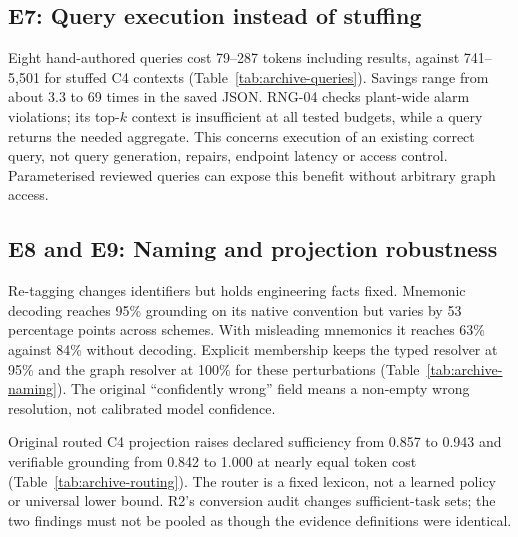 \subsection{E7: Query execution instead of stuffing}

Eight hand-authored queries cost 79--287 tokens including results, against
741--5,501 for stuffed C4 contexts (Table~\ref{tab:archive-queries}). Savings
range from about 3.3 to 69 times in the saved JSON. RNG-04 checks plant-wide alarm violations;
its top-$k$ context is insufficient at all tested budgets, while a query returns
the needed aggregate. This concerns execution of an existing correct query, not
query generation, repairs, endpoint latency or access control. Parameterised
reviewed queries can expose this benefit without arbitrary graph access.

\subsection{E8 and E9: Naming and projection robustness}
\label{sec:e8}


Re-tagging changes identifiers but holds engineering facts fixed. Mnemonic
decoding reaches 95\% grounding on its native convention but varies by 53
percentage points across schemes. With misleading mnemonics it reaches 63\%
against 84\% without decoding. Explicit membership keeps the typed resolver
at 95\% and the graph resolver at 100\% for these perturbations
(Table~\ref{tab:archive-naming}). The original ``confidently wrong'' field means
a non-empty wrong resolution, not calibrated model confidence.

Original routed C4 projection raises declared sufficiency from 0.857 to 0.943
and verifiable grounding from 0.842 to 1.000 at nearly equal token cost
(Table~\ref{tab:archive-routing}). The router is a fixed lexicon, not a learned
policy or universal lower bound. R2's conversion audit changes sufficient-task
sets; the two findings must not be pooled as though the evidence definitions
were identical.